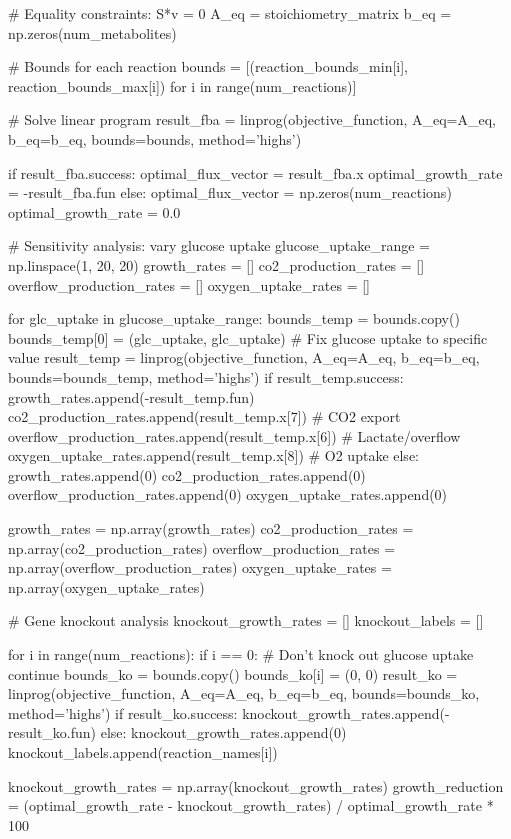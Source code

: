 \documentclass[a4paper, 11pt]{article}
\begin{document}
\begin{pycode}
# Equality constraints: S*v = 0
A_eq = stoichiometry_matrix
b_eq = np.zeros(num_metabolites)

# Bounds for each reaction
bounds = [(reaction_bounds_min[i], reaction_bounds_max[i]) for i in range(num_reactions)]

# Solve linear program
result_fba = linprog(objective_function, A_eq=A_eq, b_eq=b_eq, bounds=bounds, method='highs')

if result_fba.success:
    optimal_flux_vector = result_fba.x
    optimal_growth_rate = -result_fba.fun
else:
    optimal_flux_vector = np.zeros(num_reactions)
    optimal_growth_rate = 0.0

# Sensitivity analysis: vary glucose uptake
glucose_uptake_range = np.linspace(1, 20, 20)
growth_rates = []
co2_production_rates = []
overflow_production_rates = []
oxygen_uptake_rates = []

for glc_uptake in glucose_uptake_range:
    bounds_temp = bounds.copy()
    bounds_temp[0] = (glc_uptake, glc_uptake)  # Fix glucose uptake to specific value
    result_temp = linprog(objective_function, A_eq=A_eq, b_eq=b_eq, bounds=bounds_temp, method='highs')
    if result_temp.success:
        growth_rates.append(-result_temp.fun)
        co2_production_rates.append(result_temp.x[7])  # CO2 export
        overflow_production_rates.append(result_temp.x[6])  # Lactate/overflow
        oxygen_uptake_rates.append(result_temp.x[8])  # O2 uptake
    else:
        growth_rates.append(0)
        co2_production_rates.append(0)
        overflow_production_rates.append(0)
        oxygen_uptake_rates.append(0)

growth_rates = np.array(growth_rates)
co2_production_rates = np.array(co2_production_rates)
overflow_production_rates = np.array(overflow_production_rates)
oxygen_uptake_rates = np.array(oxygen_uptake_rates)

# Gene knockout analysis
knockout_growth_rates = []
knockout_labels = []

for i in range(num_reactions):
    if i == 0:  # Don't knock out glucose uptake
        continue
    bounds_ko = bounds.copy()
    bounds_ko[i] = (0, 0)
    result_ko = linprog(objective_function, A_eq=A_eq, b_eq=b_eq, bounds=bounds_ko, method='highs')
    if result_ko.success:
        knockout_growth_rates.append(-result_ko.fun)
    else:
        knockout_growth_rates.append(0)
    knockout_labels.append(reaction_names[i])

knockout_growth_rates = np.array(knockout_growth_rates)
growth_reduction = (optimal_growth_rate - knockout_growth_rates) / optimal_growth_rate * 100


\end{pycode}
\end{document}
